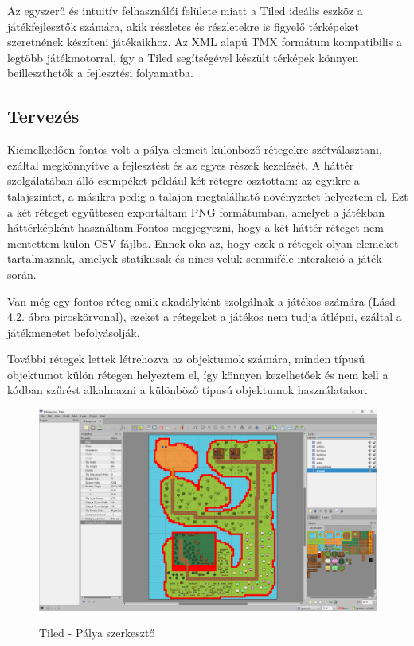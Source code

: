 Az egyszerű és intuitív felhasználói felülete miatt a Tiled ideális eszköz a játékfejlesztők számára, akik részletes és részletekre is figyelő térképeket szeretnének készíteni játékaikhoz. Az XML alapú TMX formátum kompatibilis a legtöbb játékmotorral, így a Tiled segítségével készült térképek könnyen beilleszthetők a fejlesztési folyamatba.


\subsection{Tervezés}

\indent \indent Kiemelkedően fontos volt a pálya elemeit különböző rétegekre szétválasztani, ezáltal megkönnyítve a fejlesztést és az egyes részek kezelését. A háttér szolgálatában álló csempéket például két rétegre osztottam: az egyikre a talajszintet, a másikra pedig a talajon megtalálható növényzetet helyeztem el. Ezt a két réteget együttesen exportáltam PNG formátumban, amelyet a játékban háttérképként használtam.Fontos megjegyezni, hogy a két háttér réteget nem mentettem külön CSV fájlba. Ennek oka az, hogy ezek a rétegek olyan elemeket tartalmaznak, amelyek statikusak és nincs velük semmiféle interakció a játék során. 

Van még egy fontos réteg amik akadályként szolgálnak a játékos számára (Lásd 4.2. ábra piroskörvonal), ezeket a rétegeket a játékos nem tudja átlépni, ezáltal a játékmenetet befolyásolják.  

További rétegek lettek létrehozva az objektumok számára, minden típusú objektumot külön rétegen helyeztem el, így könnyen kezelhetőek és nem kell a kódban szűrést alkalmazni a különböző típusú objektumok használatakor.

\begin{figure}[H]
    \centering
    \includegraphics[width=14.0truecm]{images/Tiled.png}
    \caption{Tiled - Pálya szerkesztő}
    \label{fig:Tiled}\cite{Tiled}
\end{figure}

